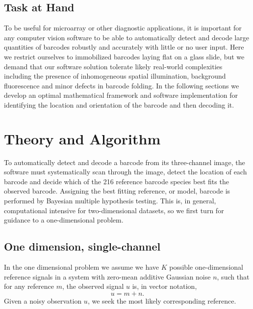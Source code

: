 \subsection{Task at Hand}
To be useful for microarray or other diagnostic applications, it is important for any computer vision software to be able to automatically detect and decode large quantities of barcodes robustly and accurately with little or no user input. 
Here we restrict ourselves to immobilized barcodes laying flat on a glass slide, but we demand that our software solution tolerate  likely real-world complexities including the presence of inhomogeneous spatial illumination, background fluorescence and minor defects in barcode folding.  
In the following sections we develop an optimal mathematical framework and software implementation for identifying the location and orientation of the barcode and then decoding it.


\section{Theory and Algorithm}
To automatically detect and decode a barcode from its three-channel image, the software must systematically scan through the image, detect the location of each barcode and decide which of the 216 reference barcode species best fits the observed barcode. Assigning the best fitting reference, or model, barcode is performed by Bayesian multiple hypothesis testing. This is, in general, computational intensive for two-dimensional datasets, so we first turn for guidance to a one-dimensional problem.


\subsection{One dimension, single-channel}
In the one dimensional problem we assume we have $K$ possible one-dimensional reference signals in a system with zero-mean additive Gaussian noise $n$, such that for any reference $m$, the observed signal $u$ is, in vector notation,
\begin{equation}
u=m + n.
\end{equation}
Given a noisy observation $u$, we seek the most likely corresponding reference. 




